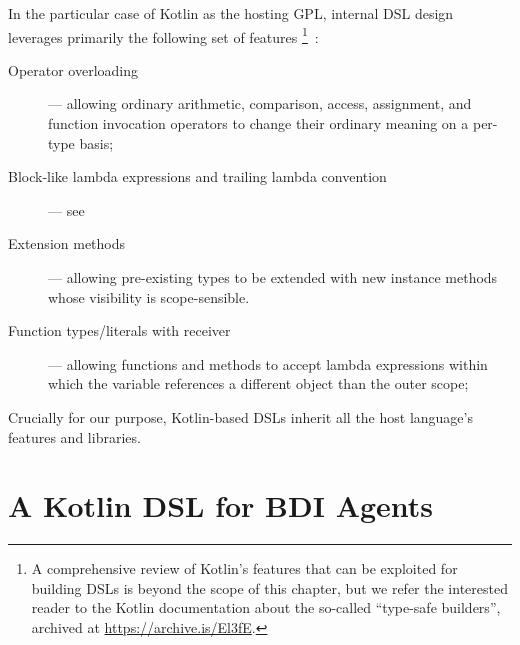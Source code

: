 In the particular case of Kotlin as the hosting \ac{GPL},
internal \ac{DSL} design leverages primarily the following set of features%
\footnote{
    A comprehensive review of Kotlin's features that can be exploited for building \acp{DSL}
    is beyond the scope of this chapter,
    but we refer the interested reader to the Kotlin documentation about the so-called ``type-safe builders'',
    archived at \url{https://archive.is/El3fE}.
}~\cite{kotlindsi4prolog-woa2020}:
%
\begin{description}
    \item[Operator overloading\footnotemark] ---
        allowing ordinary arithmetic, comparison, access, assignment, and function invocation operators to change their ordinary meaning on a per-type basis;
    \item[Block-like lambda expressions and trailing lambda convention\footnotemark] ---
        see 
    \item[Extension methods\footnotemark] ---
        allowing pre-existing types to be extended with new instance methods whose visibility is scope-sensible.
    \item[Function types/literals with receiver] ---
        allowing functions and methods to accept lambda expressions within which the  variable references a different object than the outer scope;
\end{description}
%
Crucially for our purpose,
Kotlin-based \acp{DSL} inherit all the host language's features and libraries.
%
%


\section{A Kotlin \ac{DSL} for BDI Agents}
\label{sec:jaktadsl}

